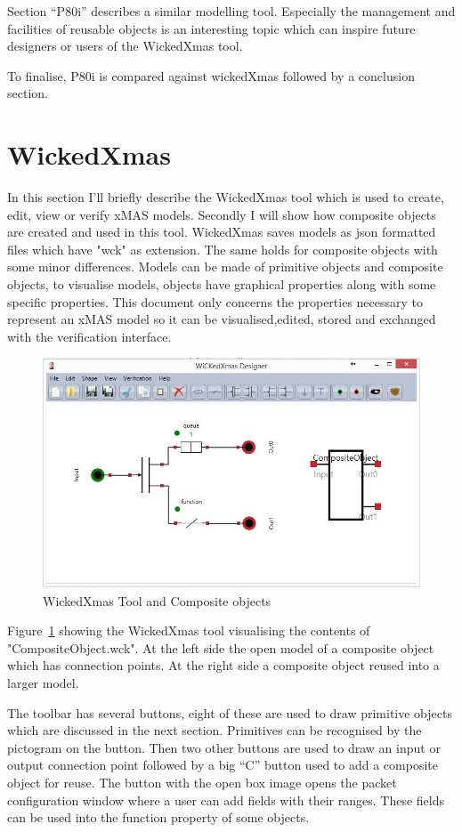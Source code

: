 \documentclass[a4paper,11pt,final]{article}
\begin{document}
Section ``P80i'' describes a similar modelling tool. Especially the management
and facilities of reusable objects is an interesting topic which can inspire
future designers or users of the WickedXmas tool.

To finalise, P80i is compared against wickedXmas followed by a conclusion section.

\newpage
\section{WickedXmas}
In this section I'll briefly describe the WickedXmas tool which is used
to create, edit, view or verify xMAS models. Secondly I will show how
composite objects are created and used in this tool.
WickedXmas saves models as json formatted files which have "wck" as
extension. The same holds for composite objects with some minor
differences. Models can be made of primitive objects and composite objects,
to visualise models, objects have graphical properties along with some
specific properties. 
This document only concerns the properties necessary to represent an
xMAS model so it can be visualised,edited, stored and exchanged with
the verification interface.

\begin{figure}[here]
\includegraphics[width=1.0\textwidth]{wxmCO}
\caption{WickedXmas Tool and Composite objects}
\label{fig:wxmCO}
\end{figure}
Figure~\ref{fig:wxmCO} showing the WickedXmas tool visualising the contents
of "CompositeObject.wck". At the left side the open model of a composite
object which has connection points. At the right side a composite
object reused into a larger model.

The toolbar has several buttons, eight of these are used to draw
primitive objects which are discussed in the next section. Primitives can be
recognised by the pictogram on the button. Then two other buttons are used to
draw an input or output connection point followed by a big ``C'' button
used to add a composite object for reuse.
The button with the open box image opens the packet configuration
window where a user can add fields with their ranges. These fields can be
used into the function property of some objects.
\end{document}
